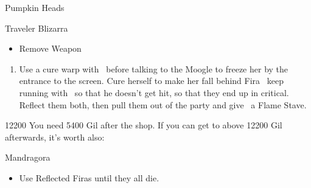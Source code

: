 \begin{battle}{Pumpkin Heads}
\begin{itemize}
\vaanf Traveler
\ashef Blizarra
\begin{menu}
\begin{itemize}
\item \travelercheck 
\penelof Remove Weapon
\end{itemize}
\end{menu}
\end{itemize}
\end{battle}
\begin{enumerate}
	\item Use a cure warp with \penelo\ before talking to the Moogle to freeze her by the entrance to the screen.
	      \ashef Cure herself to make her fall behind
	      \penelof Fira \ashe\, keep running with \vaan\ so that he doesn't get hit, so that they end up in critical. Reflect them both, then pull them out of the party and give \penelo\ a Flame Stave.
\end{enumerate}
\begin{shop}{12200}
	You need 5400 Gil after the shop. If you can get to above 12200 Gil afterwards, it's worth also:
\end{shop}
\begin{battle}{Mandragora}
	\begin{itemize}
		\vaanf Wait for them to gather up, then Traveler them.
		\item Use Reflected Firas until they all die.
	\end{itemize}
\end{battle}